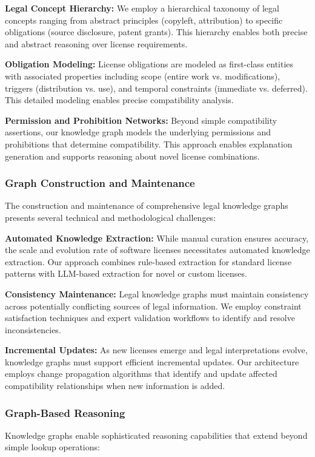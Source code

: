 \documentclass[9pt,twocolumn]{article}
\begin{document}
\textbf{Legal Concept Hierarchy:} We employ a hierarchical taxonomy of legal concepts ranging from abstract principles (copyleft, attribution) to specific obligations (source disclosure, patent grants). This hierarchy enables both precise and abstract reasoning over license requirements.

\textbf{Obligation Modeling:} License obligations are modeled as first-class entities with associated properties including scope (entire work vs. modifications), triggers (distribution vs. use), and temporal constraints (immediate vs. deferred). This detailed modeling enables precise compatibility analysis.

\textbf{Permission and Prohibition Networks:} Beyond simple compatibility assertions, our knowledge graph models the underlying permissions and prohibitions that determine compatibility. This approach enables explanation generation and supports reasoning about novel license combinations.

\subsubsection{Graph Construction and Maintenance}
The construction and maintenance of comprehensive legal knowledge graphs presents several technical and methodological challenges:

\textbf{Automated Knowledge Extraction:} While manual curation ensures accuracy, the scale and evolution rate of software licenses necessitates automated knowledge extraction. Our approach combines rule-based extraction for standard license patterns with LLM-based extraction for novel or custom licenses.

\textbf{Consistency Maintenance:} Legal knowledge graphs must maintain consistency across potentially conflicting sources of legal information. We employ constraint satisfaction techniques and expert validation workflows to identify and resolve inconsistencies.

\textbf{Incremental Updates:} As new licenses emerge and legal interpretations evolve, knowledge graphs must support efficient incremental updates. Our architecture employs change propagation algorithms that identify and update affected compatibility relationships when new information is added.

\subsubsection{Graph-Based Reasoning}
Knowledge graphs enable sophisticated reasoning capabilities that extend beyond simple lookup operations:
\end{document}
